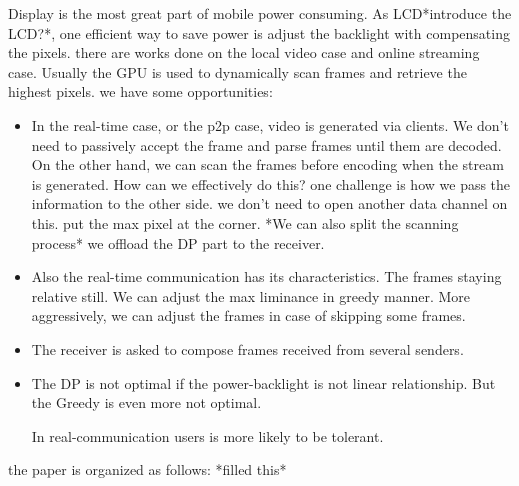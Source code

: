Display is the most great part of mobile power consuming. As
LCD*introduce the LCD?*, one 
efficient way to save power is adjust the backlight with compensating
the pixels. there are works done on the local video case and online
streaming case. Usually the GPU is used to dynamically scan frames and
retrieve the highest pixels. we have some opportunities:
\begin{itemize}
  \item
    {
      In the real-time case, or the p2p case, video is generated via
      clients. We don't need to passively accept the frame and parse
      frames until them are decoded. On the other hand, we can scan
      the frames before encoding when the stream is
      generated. How can we effectively do this? one challenge is how
      we pass the information to the other side. we
      don't need to open another data channel on this. put the max
      pixel at the corner.
      *We can also split the scanning process*
      we offload the DP part to the receiver.
    }
  \item
    {
      Also the real-time communication has its characteristics. The
      frames staying relative still. We can adjust the max liminance
      in greedy manner. More aggressively, we can adjust the frames
      in case of skipping some frames. 
    }
  \item
    {
      The receiver is asked to compose frames received from several
      senders. 
    }
  \item
    {
      The DP is not optimal if the power-backlight is not linear
      relationship. But the Greedy is even more not optimal.

      In real-communication users is more likely to be tolerant. 
    }
\end{itemize}

the paper is organized as follows: *filled this*

